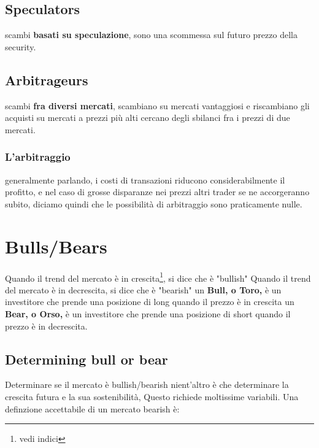 \documentclass[a4paper,11pt]{report}
\begin{document}
{\subsection{Speculators}
	scambi \textbf{basati su speculazione}, sono una scommessa sul futuro prezzo della security.
\subsection{Arbitrageurs}
	scambi \textbf{fra diversi mercati}, scambiano su mercati vantaggiosi e riscambiano gli acquisti su mercati a prezzi più alti \newline
	cercano degli sbilanci fra i prezzi di due mercati.
\subsubsection{L'arbitraggio}
	generalmente parlando, i costi di transazioni riducono considerabilmente il profitto, e nel caso di grosse disparanze nei prezzi 		altri trader se ne accorgeranno subito, diciamo quindi che le possibilità di arbitraggio sono praticamente nulle.
\newpage
\section{Bulls/Bears} %
	Quando il trend del mercato è in crescita\footnote{vedi indici}, si dice che è "bullish" \newline
	Quando il trend del mercato è in decrescita, si dice che è "bearish" \newline
	un \textbf{Bull, o Toro,} è un investitore che prende una posizione di long quando il prezzo è in crescita \newline
	un \textbf{Bear, o Orso,} è un investitore che prende una posizione di short quando il prezzo è in decrescita. \newline
\emph{}
\subsection{Determining bull or bear}
	Determinare se il mercato è bullish/bearish nient'altro è che determinare la crescita futura e la sua sostenibilità, \newline
	Questo richiede moltissime variabili. \newline
	Una definzione accettabile di un mercato bearish è: 

\emph{}

}
\end{document}
